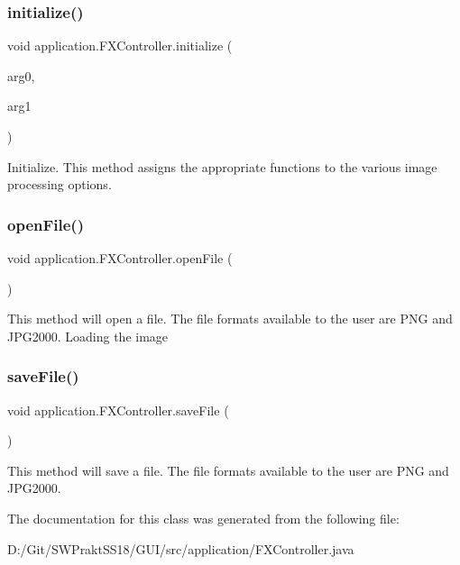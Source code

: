 \subsubsection{\texorpdfstring{initialize()}{initialize()}}
{\footnotesize\ttfamily void application.\+F\+X\+Controller.\+initialize (\begin{DoxyParamCaption}\item[{U\+RL}]{arg0,  }\item[{Resource\+Bundle}]{arg1 }\end{DoxyParamCaption})}

Initialize. This method assigns the appropriate functions to the various image processing options. \mbox{\label{classapplication_1_1_f_x_controller_a46a8c8b397699390607ad6bff526d386}} 
\subsubsection{\texorpdfstring{open\+File()}{openFile()}}
{\footnotesize\ttfamily void application.\+F\+X\+Controller.\+open\+File (\begin{DoxyParamCaption}{ }\end{DoxyParamCaption})}

This method will open a file. The file formats available to the user are P\+NG and J\+P\+G2000. Loading the image\mbox{\label{classapplication_1_1_f_x_controller_af9d560a93b56e46e95d267e0e4b205a2}} 
\subsubsection{\texorpdfstring{save\+File()}{saveFile()}}
{\footnotesize\ttfamily void application.\+F\+X\+Controller.\+save\+File (\begin{DoxyParamCaption}{ }\end{DoxyParamCaption})}

This method will save a file. The file formats available to the user are P\+NG and J\+P\+G2000. 

The documentation for this class was generated from the following file\+:\begin{DoxyCompactItemize}
\item 
D\+:/\+Git/\+S\+W\+Prakt\+S\+S18/\+G\+U\+I/src/application/F\+X\+Controller.\+java\end{DoxyCompactItemize}
